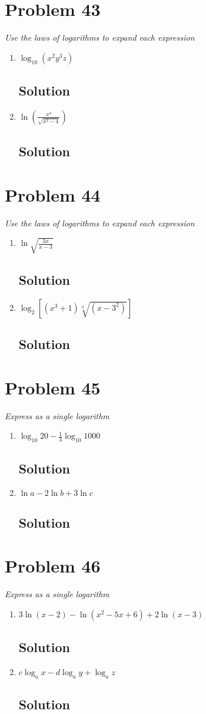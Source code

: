 \documentclass[11pt]{article}
\newcommand{\soln}{\subsection*}
\newcommand{\qn}{\textit}
\begin{document}
\section*{Problem 43}

\qn{Use the laws of logarithms to expand each expression}
\begin{enumerate}
	\item \qn{$\log_{10}(x^2y^3z)$}
	\soln{Solution}
	
	\item \qn{$\ln(\frac{x^4}{\sqrt{x^2-4}})$}
	\soln{Solution}
\end{enumerate}

\section*{Problem 44}

\qn{Use the laws of logarithms to expand each expression}
\begin{enumerate}
	\item \qn{$\ln\sqrt{\frac{3x}{x-3}}$}
	\soln{Solution}
	
	\item \qn{$\log_2[(x^3+1)\sqrt[3]{(x-3^2)}]$}
	\soln{Solution}
\end{enumerate}

\section*{Problem 45}

\qn{Express as a single logarithm}
\begin{enumerate}
	\item \qn{$\log_{10}{20} - \frac{1}{3}\log_{10}{1000}$}
	\soln{Solution}
	
	\item \qn{$\ln{a}-2\ln{b}+3\ln{c}$}
	\soln{Solution}
\end{enumerate}

\section*{Problem 46}

\qn{Express as a single logarithm}
\begin{enumerate}
	\item \qn{$3\ln(x-2)-\ln(x^2-5x+6)+2\ln(x-3)$}
	\soln{Solution}
	
	\item \qn{$c\log_a{x}-d\log_a{y}+\log_a{z}$}
	\soln{Solution}
\end{enumerate}
\end{document}
